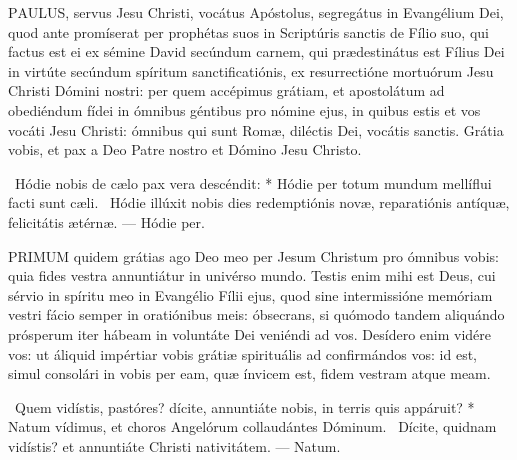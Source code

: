 



\lettrine[lines=2]{P}{AULUS}, servus Jesu Christi, vocátus Apóstolus, segregátus in Evangélium Dei, quod ante promíserat per prophétas suos in Scriptúris sanctis de Fílio suo, qui factus est ei ex sémine David secúndum carnem, qui prædestinátus est Fílius Dei in virtúte secúndum spíritum sanctificatiónis, ex resurrectióne mortuórum Jesu Christi Dómini nostri: per quem accépimus grátiam, et apostolátum ad obediéndum fídei in ómnibus géntibus pro nómine ejus, in quibus estis et vos vocáti Jesu Christi: ómnibus qui sunt Romæ, diléctis Dei, vocátis sanctis. Grátia vobis, et pax a Deo Patre nostro et Dómino Jesu Christo.

\R\ Hódie nobis de cælo pax vera descéndit: * Hódie per totum mundum mellíflui facti sunt cæli. \V\ Hódie illúxit nobis dies redemptiónis novæ, reparatiónis antíquæ, felicitátis ætérnæ. --- Hódie per.


\lettrine[lines=2]{P}{RIMUM} quidem grátias ago Deo meo per Jesum Christum pro ómnibus vobis: quia fides vestra annuntiátur in univérso mundo. Testis enim mihi est Deus, cui sérvio in spíritu meo in Evangélio Fílii ejus, quod sine intermissióne memóriam vestri fácio semper in oratiónibus meis: óbsecrans, si quómodo tandem aliquándo prósperum iter hábeam in voluntáte Dei veniéndi ad vos. Desídero enim vidére vos: ut áliquid impértiar vobis grátiæ spirituális ad confirmándos vos: id est, simul consolári in vobis per eam, quæ ínvicem est, fidem vestram atque meam.

\R\ Quem vidístis, pastóres? dícite, annuntiáte nobis, in terris quis appáruit? * Natum vídimus, et choros Angelórum collaudántes Dóminum. \V\ Dícite, quidnam vidístis? et annuntiáte Christi nativitátem. --- Natum.

